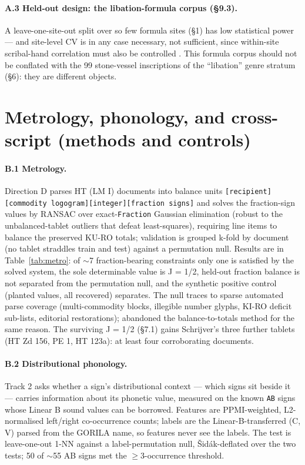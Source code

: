 \paragraph{A.3 Held-out design: the libation-formula corpus (\S9.3).} A
leave-one-site-out split over so few formula sites (\S1) has
low statistical power --- and site-level CV is in any case necessary, not
sufficient, since within-site scribal-hand correlation must also be controlled
\citep{salgarellajudson2024}. This formula corpus should not be conflated with
the 99 stone-vessel inscriptions of the ``libation'' genre stratum (\S6): they
are different objects.

\section{Metrology, phonology, and cross-script (methods and controls)}

\paragraph{B.1 Metrology.} Direction D parses HT (LM I) documents into
balance units \texttt{[recipient][commodity logogram][integer][fraction
signs]} and solves the fraction-sign values by RANSAC over exact-\texttt{Fraction}
Gaussian elimination (robust to the unbalanced-tablet outliers that defeat
least-squares), requiring line items to balance the preserved KU-RO totals;
validation is grouped k-fold by document (no tablet straddles train and
test) against a permutation null. Results are in Table~\ref{tab:metro}: of
$\sim$7 fraction-bearing constraints only one is satisfied by the solved
system, the sole determinable value is J = 1/2, held-out fraction balance
is not separated from the permutation null, and the synthetic positive
control (planted values, all recovered) separates. The null traces to sparse
automated parse coverage (multi-commodity blocks, illegible number glyphs,
KI-RO deficit sub-lists, editorial restorations); \citet[p.~2]{corazza2021}
abandoned the balance-to-totals method for the same reason. The surviving J
= 1/2 (\S7.1) gains Schrijver's
\citeyearpar{schrijver2014} three further tablets (HT Zd 156, PE 1, HT
123a): at least four corroborating documents.

\paragraph{B.2 Distributional phonology.} Track 2 asks whether a sign's
distributional context --- which signs sit beside it --- carries
information about its phonetic value, measured on the known \texttt{AB}
signs whose Linear B sound values can be borrowed. Features are
PPMI-weighted, L2-normalised left/right co-occurrence counts; labels are
the Linear-B-transferred (C, V) parsed from the GORILA name, so features
never see the labels. The test is leave-one-out 1-NN against a
label-permutation null, \v{S}id\'{a}k-deflated over the two tests; 50 of
$\sim$55 AB signs met the $\ge$3-occurrence threshold.

